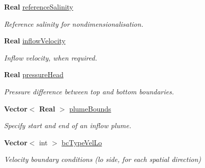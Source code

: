 \begin{DoxyCompactItemize}
\mbox{\label{class_mushy_layer_params_a0c53c6f3d00bb95fbdb3c3a2c42275ec}} 
\textbf{ Real} \hyperlink{class_mushy_layer_params_a0c53c6f3d00bb95fbdb3c3a2c42275ec}{reference\+Salinity}
\begin{DoxyCompactList}\small\item\em Reference salinity for nondimensionalisation. \end{DoxyCompactList}\item 
\mbox{\label{class_mushy_layer_params_a624702d391490bba774a2f9db3db004f}} 
\textbf{ Real} \hyperlink{class_mushy_layer_params_a624702d391490bba774a2f9db3db004f}{inflow\+Velocity}
\begin{DoxyCompactList}\small\item\em Inflow velocity, when required. \end{DoxyCompactList}\item 
\mbox{\label{class_mushy_layer_params_a7e689b4f8e1c531490260fd0bb3cec9a}} 
\textbf{ Real} \hyperlink{class_mushy_layer_params_a7e689b4f8e1c531490260fd0bb3cec9a}{pressure\+Head}
\begin{DoxyCompactList}\small\item\em Pressure difference between top and bottom boundaries. \end{DoxyCompactList}\item 
\mbox{\label{class_mushy_layer_params_a958ff5abdfeb7c6e40b1f872730fe096}} 
\textbf{ Vector}$<$ \textbf{ Real} $>$ \hyperlink{class_mushy_layer_params_a958ff5abdfeb7c6e40b1f872730fe096}{plume\+Bounds}
\begin{DoxyCompactList}\small\item\em Specify start and end of an inflow plume. \end{DoxyCompactList}\item 
\mbox{\label{class_mushy_layer_params_ab4202e8c981298a3723c865fefd5595b}} 
\textbf{ Vector}$<$ int $>$ \hyperlink{class_mushy_layer_params_ab4202e8c981298a3723c865fefd5595b}{bc\+Type\+Vel\+Lo}
\begin{DoxyCompactList}\small\item\em Velocity boundary conditions (lo side, for each spatial direction) \end{DoxyCompactList}\item 

\end{DoxyCompactItemize}
